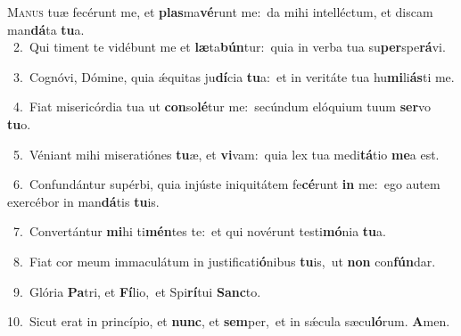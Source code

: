 \lettrine{\initial\textcolor{\initialcolor}{M}}{anus} tuæ fecérunt me, et \textbf{plas}\-ma\-\textbf{vé}\-runt me:~\star da mihi intelléctum, et discam man\-\textbf{dá}\-ta \textbf{tu}\-a.\\
{\numbfont\textcolor{\numbcolor}{~2.}}~Qui timent te vidébunt me et \textbf{læ}\-ta\-\textbf{bún}\-tur:~\star quia in verba tua su\-\textbf{per}\-spe\-\textbf{rá}\-vi.\par
{\numbfont\textcolor{\numbcolor}{~3.}}~Cognóvi, Dómine, quia ǽquitas ju\-\textbf{dí}\-cia \textbf{tu}\-a:~\star et in veritáte tua hu\-\textbf{mi}\-li\-\textbf{ás}\-ti me.\par
{\numbfont\textcolor{\numbcolor}{~4.}}~Fiat misericórdia tua ut \textbf{con}\-so\-\textbf{lé}\-tur me:~\star secúndum elóquium tuum \textbf{ser}\-vo \textbf{tu}\-o.\par
{\numbfont\textcolor{\numbcolor}{~5.}}~Véniant mihi miseratiónes \textbf{tu}\-æ, et \textbf{vi}\-vam:~\star quia lex tua medi\-\textbf{tá}\-tio \textbf{me}\-a est.\par
{\numbfont\textcolor{\numbcolor}{~6.}}~Confundántur supérbi, quia injúste iniquitátem fe\-\textbf{cé}\-runt \textbf{in} me:~\star ego autem exercébor in man\-\textbf{dá}\-tis \textbf{tu}\-is.\par
{\numbfont\textcolor{\numbcolor}{~7.}}~Convertántur \textbf{mi}\-hi ti\-\textbf{mén}\-tes te:~\star et qui novérunt testi\-\textbf{mó}\-nia \textbf{tu}\-a.\par
{\numbfont\textcolor{\numbcolor}{~8.}}~Fiat cor meum immaculátum in justificati\-\textbf{ó}\-nibus \textbf{tu}\-is,~\star ut \textbf{non} con\-\textbf{fún}\-dar.\par
{\numbfont\textcolor{\numbcolor}{~9.}}~Glória \textbf{Pa}\-tri, et \textbf{Fí}\-lio,~\star et Spi\-\textbf{rí}\-tui \textbf{Sanc}\-to.\par
{\numbfont\textcolor{\numbcolor}{10.}}~Sicut erat in princípio, et \textbf{nunc}\-, et \textbf{sem}\-per,~\star et in sǽcula sæcu\-\textbf{ló}\-rum. \textbf{A}\-men.\par

